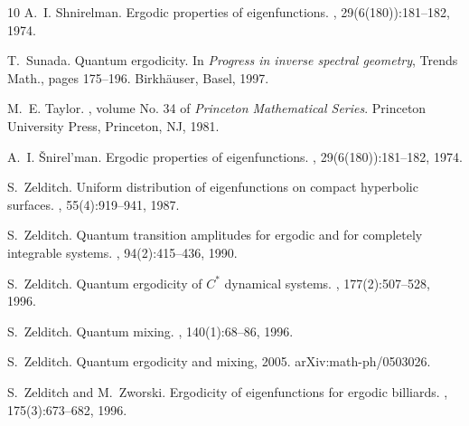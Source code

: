 \documentclass[11pt,twoside,reqno]{amsart}
\newcommand{\1}{\mathrm{\mathbf{1}}}
\numberwithin{equation}{section}
\theoremstyle{plain}
\theoremstyle{definition}
\theoremstyle{remark}
\begin{document}
\begin{thebibliography}{10}
A.~I. Shnirelman.
\newblock Ergodic properties of eigenfunctions.
, 29(6(180)):181--182, 1974.

T.~Sunada.
\newblock Quantum ergodicity.
\newblock In {\em Progress in inverse spectral geometry}, Trends Math., pages 175--196. Birkh\"auser, Basel, 1997.

M.~E. Taylor.
, volume No. 34 of {\em Princeton Mathematical Series}.
\newblock Princeton University Press, Princeton, NJ, 1981.

A.~I. \v{S}nirel'man.
\newblock Ergodic properties of eigenfunctions.
, 29(6(180)):181--182, 1974.

S.~Zelditch.
\newblock Uniform distribution of eigenfunctions on compact hyperbolic surfaces.
, 55(4):919--941, 1987.

S.~Zelditch.
\newblock Quantum transition amplitudes for ergodic and for completely integrable systems.
, 94(2):415--436, 1990.

S.~Zelditch.
\newblock Quantum ergodicity of {$C^*$} dynamical systems.
, 177(2):507--528, 1996.

S.~Zelditch.
\newblock Quantum mixing.
, 140(1):68--86, 1996.

S.~Zelditch.
\newblock Quantum ergodicity and mixing, 2005.
\newblock arXiv:math-ph/0503026.

S.~Zelditch and M.~Zworski.
\newblock Ergodicity of eigenfunctions for ergodic billiards.
, 175(3):673--682, 1996.

\end{thebibliography}
\end{document}
